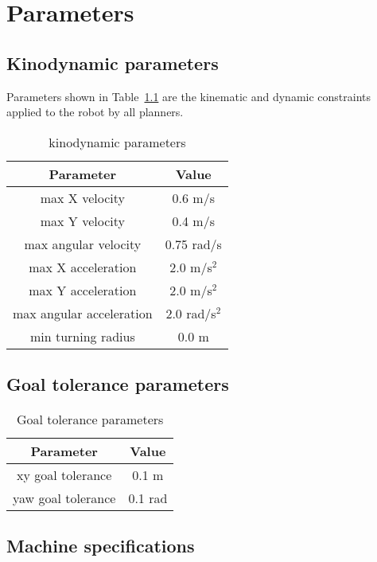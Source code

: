 \chapter{Parameters}
\label{appendix_parameters}

\section{Kinodynamic parameters}%
\label{sec:kinodynamic_parameters}
Parameters shown in Table~\ref{tab:kinodynamic_parameters} are the kinematic and dynamic constraints
applied to the robot by all planners.
\begin{table}[H]
    \centering
    \begin{tabular}{cc}
        \textbf{Parameter} & \textbf{Value} \\\toprule
        max X velocity & 0.6 m/s \\
        max Y velocity & 0.4 m/s \\
        max angular velocity & 0.75 rad/s \\
        max X acceleration & 2.0 m/s$^2$ \\
        max Y acceleration & 2.0 m/s$^2$ \\
        max angular acceleration & 2.0 rad/s$^2$\\
        min turning radius & 0.0 m \\
    \end{tabular}
    \caption{kinodynamic parameters}\label{tab:kinodynamic_parameters}
\end{table}


\section{Goal tolerance parameters}%
\label{sec:goal_tolerance_parameters}

\begin{table}[H]
    \centering
    \begin{tabular}{cc}
        \textbf{Parameter} & \textbf{Value} \\\toprule
        xy goal tolerance & 0.1 m \\
        yaw goal tolerance & 0.1 rad \\
    \end{tabular}
    \caption{Goal tolerance parameters}\label{tab:goa_tolerance_parameters}
\end{table}

\section{Machine specifications}%
\label{sec:machine_specifications}

